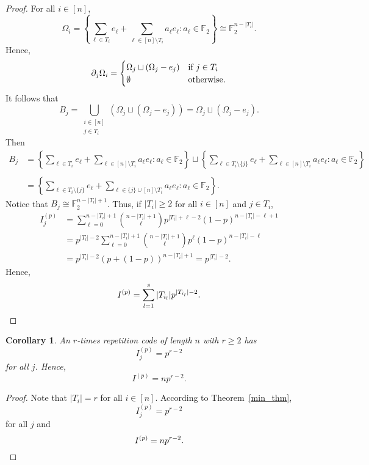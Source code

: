 \documentclass[12pt]{article}
\newcommand{\F}{\mathbb{F}}
\def\F{\mathbb F}
\newtheorem{corollary}[theorem]{Corollary}
\theoremstyle{definition}
\begin{document}
\begin{proof}
For all $i \in [n]$, $$\Omega_i = \left\{ \sum_{\ell \in T_i} e_\ell +  \sum_{\ell \in [n] \setminus T_i} a_\ell e_\ell\colon a_\ell \in \F_2 \right\} \cong \F_2^{n-| T_i |}.$$
Hence, 
$$\partial_j \Omega_i = \begin{cases}
\Omega_j \sqcup \left( \Omega_j - e_j \right) & \textnormal{if } j \in T_i \\ \emptyset & \textnormal{otherwise.} \end{cases}$$ It follows that
$$B_j = \bigcup_{\substack{i \in [n] \\[2pt] j \in T_i}} \left( \Omega_j \sqcup \left( \Omega_j - e_j \right) \right) = \Omega_j \sqcup \left( \Omega_j - e_j \right).$$
Then 
\begin{align*}
B_j &=  \left\{ \sum_{\ell \in T_i} e_\ell +  \sum_{\ell \in [n] \setminus T_i} a_\ell e_\ell\colon a_\ell \in \F_2 \right\}  \sqcup  \left\{ \sum_{\ell \in T_i \setminus \{j \}} e_\ell +  \sum_{\ell \in [n] \setminus T_i} a_\ell e_\ell\colon a_\ell \in \F_2 \right\}\\ \ \\
&=  \left\{ \sum_{\ell \in T_i \setminus \{ j \}} e_\ell +  \sum_{\ell \in \{j \} \cup [n] \setminus T_i} a_\ell e_\ell\colon a_\ell \in \F_2 \right\}.
\end{align*}
Notice that $B_j \cong \F_2^{n-| T_i | +1}$. Thus, if $| T_i | \geq 2$ for all $i \in [n]$ and $j \in T_i$,
\begin{align*}
I_j^{(p)} &= \sum_{\ell=0}^{n-| T_i |+1} \binom{{n-| T_i |+1}}{\ell}p^{| T_i |+\ell-2}(1-p)^{n-| T_i |-\ell+1}  \\ 
& =  p^{| T_i | -2} \sum_{\ell=0}^{n-| T_i |+1} \binom{{n-| T_i |+1}}{\ell}p^{\ell}(1-p)^{n-| T_i |-\ell}  \\ 
& =  p^{| T_i | -2} (p+(1-p))^{n-| T_i |+1}= p^{| T_i |-2}.
\end{align*}
Hence, 
\[
I^{(p)}=\sum_{l=1}^s | T_{i_l} | p^{| T_{i_l} | -2}. \qedhere
\]
\end{proof}



\begin{corollary} \label{rep_cor}
An $r$-times repetition code of length $n$ with $r \geq 2$ has 
$$I_j^{(p)}=p^{r-2}$$ for all $j$. Hence, 
$$I^{(p)}=n p^{r-2}.$$
\end{corollary} 

\begin{proof}
Note that $| T_i | = r$ for all $i \in [n]$. 
According to Theorem~\ref{min_thm}, $$I_j^{(p)}=p^{r-2}$$ for all $j$ and
\[I^{(p)}=n p^{r-2}. \qedhere\]
\end{proof}
\end{document}
